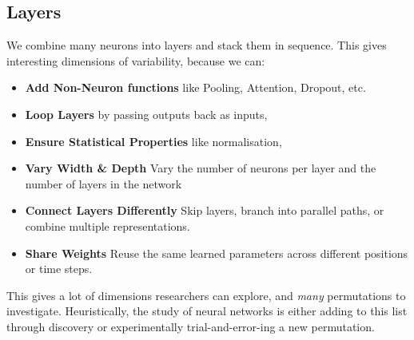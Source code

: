 \subsection{Layers}
We combine many neurons into layers and stack them in sequence.
This gives interesting dimensions of variability, because we can:
\begin{itemize}
    \item \textbf{Add Non-Neuron functions} like Pooling, Attention, Dropout, etc.
    \item \textbf{Loop Layers} by passing outputs back as inputs,
    \item \textbf{Ensure Statistical Properties} like normalisation, 
    \item \textbf{Vary Width \& Depth} Vary the number of neurons per layer and the number of layers in the network 
    \item \textbf{Connect Layers Differently} Skip layers, branch into parallel paths, or combine multiple representations.
    \item \textbf{Share Weights} Reuse the same learned parameters across different positions or time steps.
\end{itemize}

This gives a lot of dimensions researchers can explore, and \textit{many} permutations to investigate.
Heuristically, the study of neural networks is either adding to this list through discovery or experimentally trial-and-error-ing a new permutation.

